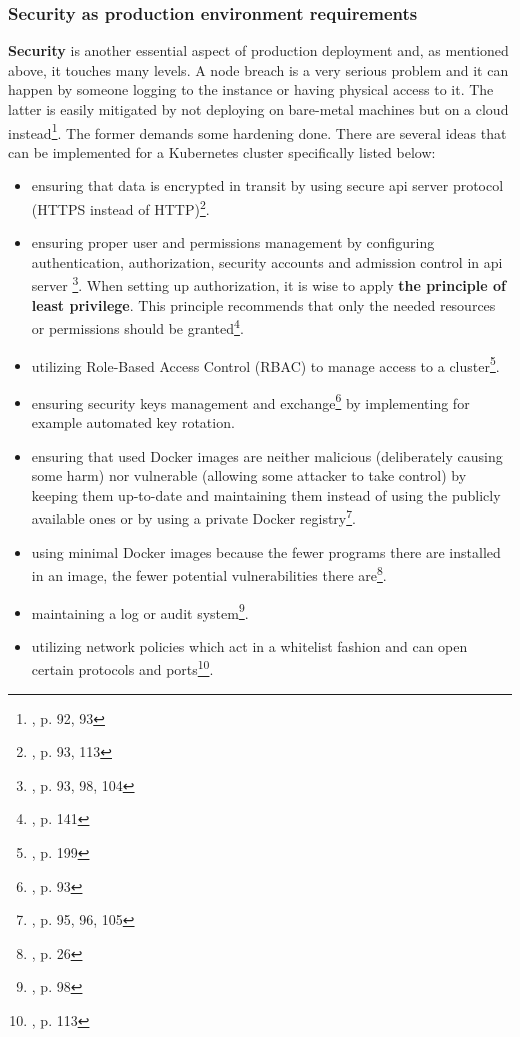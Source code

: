 {\subsubsection{Security as production environment requirements}
\textbf{Security} is another essential aspect of production deployment and, as mentioned above, it touches many levels. A node breach is a very serious problem and it can happen by someone logging to the instance or having physical access to it. The latter is easily mitigated by not deploying on bare-metal machines but on a cloud instead\footnote{\cite{book-mastering-k8s}, p. 92, 93}. The former demands some hardening done. There are several ideas that can be implemented for a Kubernetes cluster specifically listed below:
\begin{itemize}
\item ensuring that data is encrypted in transit by using secure api server protocol (HTTPS instead of HTTP)\footnote{\cite{book-mastering-k8s}, p. 93, 113}.
\item ensuring proper user and permissions management by configuring authentication, authorization, security accounts and admission control in api server \footnote{\cite{book-mastering-k8s}, p. 93, 98, 104}. When setting up authorization, it is wise to apply \textbf{the principle of least privilege}. This principle recommends that only the needed resources or permissions should be granted\footnote{\cite{book-cndwk}, p. 141}.
\item utilizing Role-Based Access Control (RBAC) to manage access to a cluster\footnote{\cite{book-cndwk}, p. 199}.
\item ensuring security keys management and exchange\footnote{\cite{book-mastering-k8s}, p. 93} by implementing for example automated key rotation.
\item ensuring that used Docker images are neither malicious (deliberately causing some harm) nor vulnerable (allowing some attacker to take control) by keeping them up-to-date and maintaining them instead of using the publicly available ones or by using a private Docker registry\footnote{\cite{book-mastering-k8s}, p. 95, 96, 105}.
\item using minimal Docker images because the fewer programs there are installed in an image, the fewer potential vulnerabilities there are\footnote{\cite{book-cndwk}, p. 26}.
\item maintaining a log or audit system\footnote{\cite{book-mastering-k8s}, p. 98}.
\item utilizing network policies which act in a whitelist fashion and can open certain protocols and ports\footnote{\cite{book-mastering-k8s}, p. 113}.

\end{itemize}}
